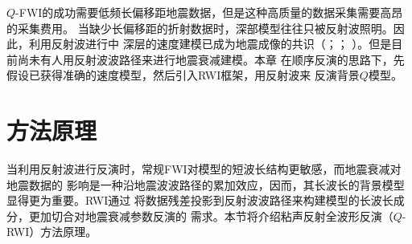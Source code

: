 $Q$-FWI的成功需要低频长偏移距地震数据，但是这种高质量的数据采集需要高昂的采集费用。
当缺少长偏移距的折射数据时，深部模型往往只被反射波照明。因此，利用反射波进行中
深层的速度建模已成为地震成像的共识（；；
）。但是目前尚未有人用反射波波路径来进行地震衰减建模。本章
在顺序反演的思路下，先假设已获得准确的速度模型，然后引入RWI框架，用反射波来
反演背景$Q$模型。

\vspace{0.5cm}
\section{方法原理}
\vspace{0.5cm}
当利用反射波进行反演时，常规FWI对模型的短波长结构更敏感，而地震衰减对地震数据的
影响是一种沿地震波波路径的累加效应，因而，其长波长的背景模型显得更为重要。RWI通过
将数据残差投影到反射波波路径来构建模型的长波长成分，更加切合对地震衰减参数反演的
需求。本节将介绍粘声反射全波形反演（$Q$-RWI）方法原理。

\vspace{0.5cm}
